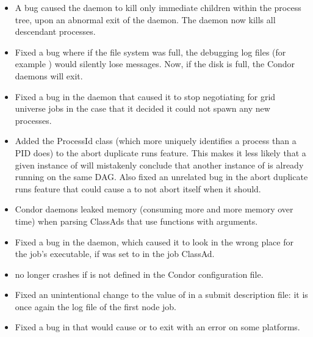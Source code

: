 \begin{itemize}

\item A bug caused the  daemon to kill
only immediate children within the process tree,
upon an abnormal exit of the  daemon. 
The  daemon now kills all descendant processes.

\item Fixed a bug where if the file system was full, the debugging log
files (for example ) would silently lose messages.  Now,
if the disk is full, the Condor daemons will 
exit.

\item Fixed a bug in the  daemon that caused it to stop
negotiating for grid universe jobs in the case that it decided
it could not spawn any new  processes.

\item Added the ProcessId class (which more uniquely identifies a
process than a PID does) to the  abort duplicate
runs feature.  This makes it less likely that a given instance of
 will mistakenly conclude that another instance of
 is already running on the same DAG.  Also fixed an
unrelated bug in the abort duplicate runs feature that could cause
a  to not abort itself when it should.

\item Condor daemons leaked memory (consuming more and more memory over time)
when parsing ClassAds that use functions with arguments.

\item Fixed a bug in the  daemon,
which caused it to look in the
wrong place for the job's executable, if  was set
to  in the job ClassAd.

\item {} no longer crashes if  is not defined
in the Condor configuration file.

\item Fixed an unintentional change to the value of 
in a  submit description file: it is once again the log file of
the first node job.

\item Fixed a bug in  that would cause   or
  to exit with an error on some platforms.


\end{itemize}
